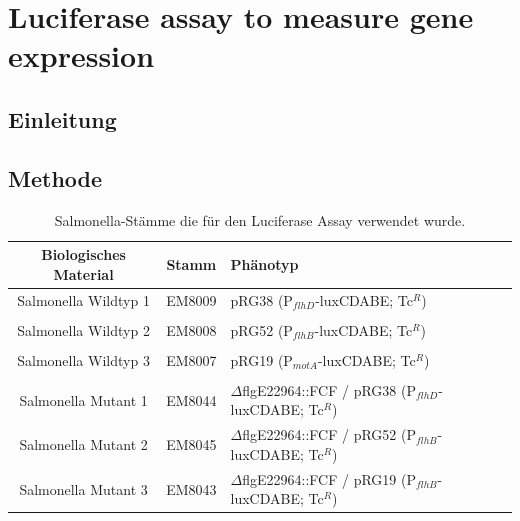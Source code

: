 \documentclass[oneside,10pt,a4paper]{report}
\begin{document}
		\section{Luciferase assay to measure gene expression}
		
			\subsection{Einleitung}
			
			\subsection{Methode}
				\begin{table}[H]
				\centering
				\caption{Salmonella-Stämme die für den Luciferase Assay verwendet wurde.}
				\label{tab: exp6-biologisches Material part2}
				\begin{tabular}{ccp{7.5cm}}
					\toprule
					Biologisches Material& Stamm & Phänotyp\\
					\midrule
					\multirow{2}{*}{\parbox[t]{2cm}{Salmonella Wildtyp 1 }}  & \multirow{2}{*}{EM8009} & \multirow{2}{*}{\parbox[t]{7.5cm}{pRG38 (P$_{flhD}$-luxCDABE; Tc$^R$)}}\\
					&&\\
					&&\\
					\multirow{2}{*}{\parbox[t]{2cm}{Salmonella Wildtyp 2}}  & \multirow{2}{*}{EM8008} & \multirow{2}{*}{\parbox[t]{7.5cm}{pRG52 (P$_{flhB}$-luxCDABE; Tc$^R$)}}\\
					&&\\
					&&\\
					\multirow{2}{*}{\parbox[t]{2cm}{Salmonella Wildtyp 3}}  & \multirow{2}{*}{EM8007} & \multirow{2}{*}{\parbox[t]{7.5cm}{pRG19 (P$_{motA}$-luxCDABE; Tc$^R$)}}\\
					&&\\
					&&\\
					\multirow{3}{*}{\parbox[t]{2cm}{Salmonella Mutant 1}} & \multirow{3}{*}{EM8044} &\multirow{3}{*}{\parbox[t]{7.5cm}{$\Delta$flgE22964::FCF / pRG38 (P$_{flhD}$-luxCDABE; Tc$^R$)}} \\
					&&\\
					&&\\
					\multirow{3}{*}{\parbox[t]{2cm}{Salmonella Mutant 2}} & \multirow{3}{*}{EM8045} &\multirow{3}{*}{\parbox[t]{7.5cm}{$\Delta$flgE22964::FCF / pRG52 (P$_{flhB}$-luxCDABE; Tc$^R$)}} \\
					&&\\
					&&\\
					\multirow{3}{*}{\parbox[t]{2cm}{Salmonella Mutant 3}} & \multirow{3}{*}{EM8043} &\multirow{3}{*}{\parbox[t]{7.5cm}{$\Delta$flgE22964::FCF / pRG19 (P$_{flhB}$-luxCDABE; Tc$^R$)}} \\
					&&\\
					&&\\
					
					\bottomrule			
				\end{tabular}
			\end{table}
			
\end{document}
